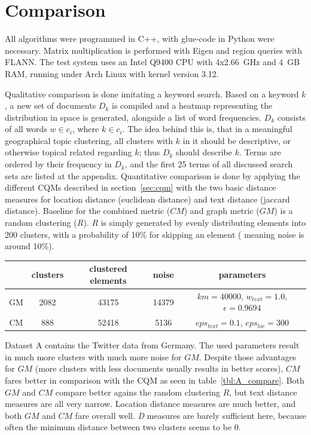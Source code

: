 

\section{Comparison}
All algorithms were programmed in C++, with glue-code in Python were necessary. Matrix multiplication is performed with Eigen\cite{Guennebaud2010} and region queries with FLANN\cite{Muja2009}. The test system uses an Intel Q9400 CPU with 4x2.66~GHz and 4~GB RAM, running under Arch Linux with kernel version 3.12.

Qualitative comparison is done imitating a keyword search. Based on a keyword $k$, a new set of documents $D_k$ is compiled and a heatmap representing the distribution in space is generated, alongside a list of word frequencies. $D_k$ consists of all words $w \in c_i$, where $k \in c_i$. The idea behind this is, that in a meaningful geographical topic clustering, all clusters with $k$ in it should be descriptive, or otherwise topical related regarding $k$; thus $D_k$ should describe $k$. Terms are ordered by their frequency in $D_k$, and the first 25 terms of all discussed search sets are listed at the appendix.
%
Quantitative comparison is done by applying the different CQMs described in section~\ref{sec:cqm} with the two basic distance measures for location distance (euclidean distance) and text distance (jaccard distance). Baseline for the combined metric ($CM$) and graph metric ($GM$) is a random clustering ($R$). $R$ is simply generated by evenly distributing elements into 200 clusters, with a probability of 10\% for skipping an element ( meaning noise is around 10\%).

%
\begin{center}
\small
{}
\begin{tabular}{cSSSc}
\toprule
 & {clusters} &{clustered elements}&{noise}&{parameters}\\
\midrule
GM & 2082 & 43175 & 14379&$km=40000$, $w_{text} = 1.0$, $\epsilon = 0.9694$\\
CM & 888 & 52418 & 5136&$eps_{text} = 0.1$, $eps_{loc} = 300$\\
\bottomrule
\end{tabular}
\end{center}
%
Dataset A contains the Twitter data from Germany. The used parameters result in much more clusters with much more noise for $GM$. Despite those advantages for $GM$ (more clusters with less documents usually results in better scores), $CM$ fares better in comparison with the CQM as seen in table~\ref{tbl:A_compare}. Both $GM$ and $CM$ compare better agains the random clustering $R$, but text distance measures are all very narrow. Location distance measures are much better, and both $GM$ and $CM$ fare overall well. \emph{D} measures are barely sufficient here, because often the minimum distance between two clusters seems to be $0$.

